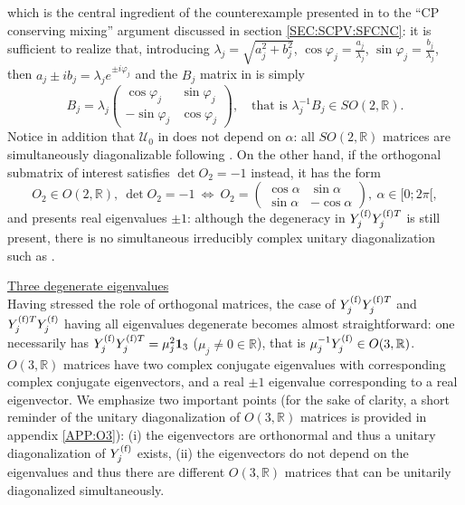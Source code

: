 \documentclass[12pt,a4paper]{article}
\begin{document}
which is the central ingredient of the counterexample presented in \cite{Ecker:1987md} to the ``CP conserving mixing'' argument discussed in section \ref{SEC:SCPV:SFCNC}: it is sufficient to realize that, introducing $\lambda_j=\sqrt{a_j^2+b_j^2}$, $\cos\varphi_j=\frac{a_j}{\lambda_j}$, $\sin\varphi_j=\frac{b_j}{\lambda_j}$, then $a_j\pm ib_j=\lambda_j e^{\pm i\varphi_j}$ and the $B_j$ matrix in  is simply
\begin{equation}\label{eq:Bj}
B_j=\lambda_j\begin{pmatrix}\cos\varphi_j&\sin\varphi_j\\ -\sin\varphi_j & \cos\varphi_j\end{pmatrix},\quad \text{that is }\lambda_j^{-1}B_j\in SO(2,\mathbb{R}).
\end{equation}
 Notice in addition that $\mathcal U_{0}$ in  does not depend on $\alpha$: all $SO(2,\mathbb{R})$ matrices are simultaneously diagonalizable following . On the other hand, if the orthogonal submatrix of interest satisfies $\det O_2=-1$ instead, it has the form
\begin{equation}
 O_2\in O(2,\mathbb{R}),\ \det O_2=-1\ \Leftrightarrow\ O_2=\begin{pmatrix}\cos \alpha & \sin\alpha\\ \sin\alpha&-\cos\alpha\end{pmatrix},\ \alpha\in [0;2\pi[,
\end{equation}
and presents real eigenvalues $\pm 1$: although the degeneracy in $Y_{j}^{\rm (f)}Y_{j}^{{\rm (f)}T}$ is still present, there is no simultaneous irreducibly complex unitary diagonalization such as .

\underline{Three degenerate eigenvalues}\\
Having stressed the role of orthogonal matrices, the case of $Y_{j}^{\rm (f)}Y_{j}^{{\rm (f)}T}$ and $Y_{j}^{{\rm (f)}T}Y_{j}^{\rm (f)}$ having all eigenvalues degenerate becomes almost straightforward: one necessarily has $Y_{j}^{\rm (f)}Y_{j}^{{\rm (f)}T}=\mu_j^2\mathbf{1}_3$ ($\mu_j\neq 0\in\mathbb{R}$), that is $\mu_j^{-1}Y_{j}^{\rm (f)}\in O(3,\mathbb{R})$. $O(3,\mathbb{R})$ matrices have two complex conjugate eigenvalues with corresponding complex conjugate eigenvectors, and a real $\pm 1$ eigenvalue corresponding to a real eigenvector. We emphasize two important points (for the sake of clarity, a short reminder of the unitary diagonalization of $O(3,\mathbb{R})$ matrices is provided in appendix \ref{APP:O3}): (i) the eigenvectors are orthonormal and thus a unitary diagonalization of $Y_{j}^{\rm (f)}$ exists, (ii) the eigenvectors do not depend on the eigenvalues and thus there are different $O(3,\mathbb{R})$ matrices that can be unitarily diagonalized simultaneously.
\end{document}
